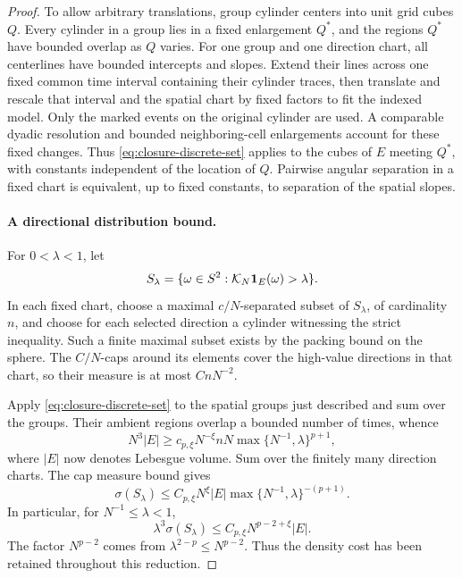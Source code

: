 \begin{proof}
To allow arbitrary translations, group cylinder centers into unit grid
cubes \(Q\).  Every cylinder in a group lies in a fixed enlargement
\(Q^*\), and the regions \(Q^*\) have bounded overlap as \(Q\) varies.
For one group and one direction chart, all centerlines have bounded
intercepts and slopes.  Extend their lines across one fixed common
time interval containing their cylinder traces, then translate and
rescale that interval and the spatial chart by fixed factors to fit the
indexed model.  Only the marked events on the original cylinder are
used.  A comparable dyadic resolution and bounded neighboring-cell
enlargements account for these fixed changes.  Thus
\eqref{eq:closure-discrete-set} applies to the cubes of \(E\) meeting
\(Q^*\), with constants independent of the location of \(Q\).
Pairwise angular separation in a fixed chart is equivalent, up to
fixed constants, to separation of the spatial slopes.

\paragraph{A directional distribution bound.}
For \(0<\lambda<1\), let
\[
  S_\lambda=\{\omega\in S^2:
                         \mathcal K_N\mathbf 1_E(\omega)>\lambda\}.
\]
In each fixed chart, choose a maximal \(c/N\)-separated subset of
\(S_\lambda\), of cardinality \(n\), and choose for each selected
direction a cylinder witnessing the strict inequality.  Such a finite
maximal subset exists by the packing bound on the sphere.  The
\(C/N\)-caps around its elements cover the high-value directions in
that chart, so their measure is at most \(CnN^{-2}\).

Apply \eqref{eq:closure-discrete-set} to the spatial groups just
described and sum over the groups.  Their ambient regions overlap a
bounded number of times, whence
\[
  N^3|E|
    \ge c_{p,\xi}N^{-\xi}nN
                     \max\{N^{-1},\lambda\}^{p+1},
\]
where \(|E|\) now denotes Lebesgue volume.  Sum over the finitely many
direction charts.  The cap measure bound gives
\begin{equation}
  \sigma(S_\lambda)
    \le C_{p,\xi}N^\xi |E|
                    \max\{N^{-1},\lambda\}^{-(p+1)}.
  \label{eq:closure-indicator-distribution}
\end{equation}
In particular, for \(N^{-1}\le\lambda<1\),
\begin{equation}
  \lambda^3\sigma(S_\lambda)
       \le C_{p,\xi}N^{p-2+\xi}|E|.
  \label{eq:closure-weak-three}
\end{equation}
The factor \(N^{p-2}\) comes from
\(\lambda^{2-p}\le N^{p-2}\).  Thus the density cost has been
retained throughout this reduction.


\end{proof}
